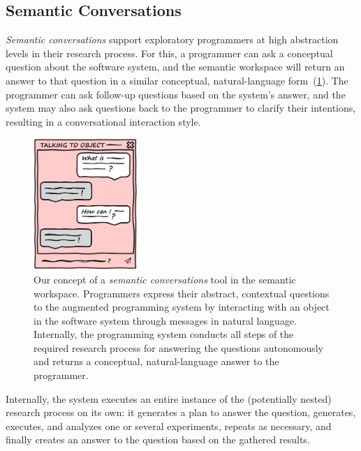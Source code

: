 \subsection{Semantic Conversations}
\label{sec:approach/workspace/conversations}

\emph{Semantic conversations} support exploratory programmers at high abstraction levels in their research process.
For this, a programmer can ask a conceptual question about the software system, and the semantic workspace will return an answer to that question in a similar conceptual, natural-language form~(\cref{fig:approach/workspace/conversation}).
The programmer can ask follow-up questions based on the system's answer, and the system may also ask questions back to the programmer to clarify their intentions, resulting in a conversational interaction style.

\begin{figure}
	\centering
	\includegraphics[width=0.35\textwidth]{02_workspace/conversation.png}
	\caption[Our concept of a \emph{semantic conversations} tool in the semantic workspace.]{
		Our concept of a \emph{semantic conversations} tool in the semantic workspace.
		Programmers express their abstract, contextual questions to the augmented programming system by interacting with an object in the software system through messages in natural language.
		Internally, the programming system conducts all steps of the required research process for answering the questions autonomously and returns a conceptual, natural-language answer to the programmer.
	}
	\label{fig:approach/workspace/conversation}
\end{figure}

Internally, the system executes an entire instance of the (potentially nested) research process on its own: it generates a plan to answer the question, generates, executes, and analyzes one or several experiments, repeats as necessary, and finally creates an answer to the question based on the gathered results.

